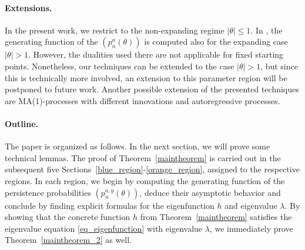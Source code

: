 \documentclass[12pt]{article}
\newcommand{\1}{\mathds{1}}
\theoremstyle{definition}
\theoremstyle{plain}
\theoremstyle{remark}
\begin{document}
\paragraph{Extensions.} In the present work, we restrict to the non-expanding regime $|\theta|\le1$. In \cite{AurzadaRaschel}, the generating function of the $(p_n^a(\theta))$ is computed also for the expanding case $|\theta|>1$.
However, the dualities used there are not applicable for fixed starting points. Nonetheless, our techniques can be extended to the case $|\theta|>1$, but since this is technically more involved, an extension to this parameter region will be postponed to future work. Another possible extension of the presented techniques are MA(1)-processes with different  innovations and autoregressive processes.
\paragraph{Outline.}
The paper is organized as follows. In the next section, we will prove some technical lemmas.  The proof of Theorem~\ref{maintheorem} is carried out in the subsequent five Sections~\ref{blue_region}-\ref{orange_region}, assigned to the respective regions. In each region, we begin by computing the generating function of the persistence probabilities $\left(p_n^{a,y}(\theta)\right)$, deduce their asymptotic behavior and conclude by finding explicit formulas for the eigenfunction $h$ and eigenvalue $\lambda$. By showing that the concrete function $h$ from Theorem~\ref{maintheorem} satisfies the eigenvalue equation \eqref{eq_eigenfunction} with eigenvalue $\lambda$, we immediately prove Theorem~\ref{maintheorem_2} as well.
\end{document}
